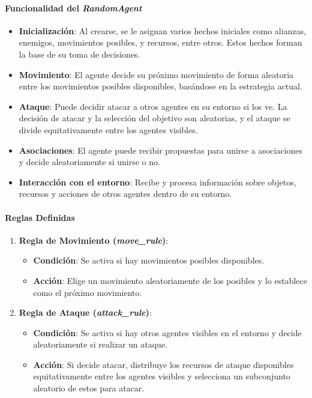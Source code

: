 \documentclass[11pt]{article}
\begin{document}
\paragraph{Funcionalidad del \textit{RandomAgent}}
\begin{itemize}
    \item \textbf{Inicialización}: Al crearse, se le asignan varios hechos iniciales como alianzas, enemigos, movimientos posibles, y recursos, entre otros. Estos hechos forman la base de su toma de decisiones.
    \item \textbf{Movimiento}: El agente decide su próximo movimiento de forma aleatoria entre los movimientos posibles disponibles, basándose en la estrategia actual.
    \item \textbf{Ataque}: Puede decidir atacar a otros agentes en su entorno si los ve. La decisión de atacar y la selección del objetivo son aleatorias, y el ataque se divide equitativamente entre los agentes visibles.
    \item \textbf{Asociaciones}: El agente puede recibir propuestas para unirse a asociaciones y decide aleatoriamente si unirse o no.
    \item \textbf{Interacción con el entorno}: Recibe y procesa información sobre objetos, recursos y acciones de otros agentes dentro de su entorno.
\end{itemize}

\paragraph{Reglas Definidas}
\begin{enumerate}
    \item \textbf{Regla de Movimiento (\textit{move\_rule})}:
          \begin{itemize}
              \item \textbf{Condición}: Se activa si hay movimientos posibles disponibles.
              \item \textbf{Acción}: Elige un movimiento aleatoriamente de los posibles y lo establece como el próximo movimiento.
          \end{itemize}
    \item \textbf{Regla de Ataque (\textit{attack\_rule})}:
          \begin{itemize}
              \item \textbf{Condición}: Se activa si hay otros agentes visibles en el entorno y decide aleatoriamente si realizar un ataque.
              \item \textbf{Acción}: Si decide atacar, distribuye los recursos de ataque disponibles equitativamente entre los agentes visibles y selecciona un subconjunto aleatorio de estos para atacar.
          \end{itemize}
\end{enumerate}
\end{document}
